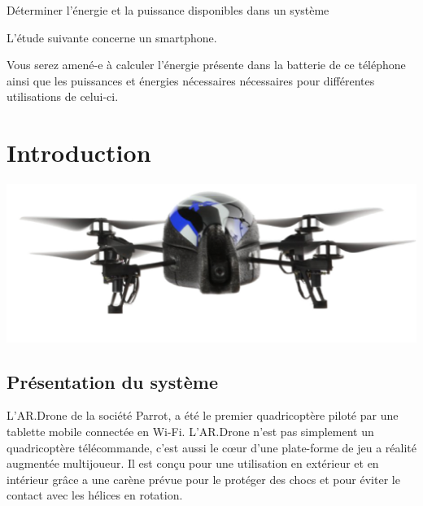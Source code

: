 \documentclass[10pt,fleqn]{article} %
\begin{document}

\begin{obj}
Déterminer l’énergie et la puissance disponibles dans un système

L’étude suivante concerne un smartphone. 

Vous serez amené-e à
 calculer l’énergie présente dans la batterie de ce téléphone ainsi que les puissances et énergies nécessaires
 nécessaires pour différentes utilisations de celui-ci.
 
\end{obj}
\section{Introduction}
\begin{center}
    \includegraphics[height=0.1\textheight]{images/drone.png}
\end{center}
    

\subsection{Présentation du système}
L'AR.Drone de la société Parrot, a été le premier quadricoptère piloté par une tablette mobile connectée en Wi-Fi. L'AR.Drone n'est pas simplement un quadricoptère télécommande, c'est aussi le cœur d'une plate-forme de jeu a réalité augmentée multijoueur.
Il est conçu pour une utilisation en extérieur et en intérieur grâce a une carène prévue pour le protéger des chocs et pour éviter le contact avec les hélices en rotation.


\end{document}
